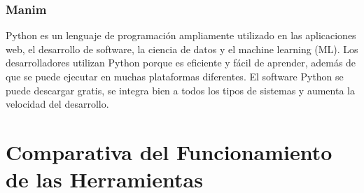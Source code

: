 \subsubsection{Manim}
Python es un lenguaje de programación ampliamente utilizado en las aplicaciones web, el desarrollo de software, la ciencia de datos y el machine learning (ML). Los desarrolladores utilizan Python porque es eficiente y fácil de aprender, además de que se puede ejecutar en muchas plataformas diferentes. El software Python se puede descargar gratis, se integra bien a todos los tipos de sistemas y aumenta la velocidad del desarrollo.

\section{Comparativa del Funcionamiento de las Herramientas}

